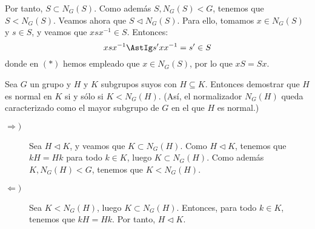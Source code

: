 \begin{ejercicio}
\begin{enumerate}
        Por tanto, $S\subset N_G(S)$. Como además $S,N_G(S)< G$, tenemos que $S< N_G(S)$. Veamos ahora que $S\lhd N_G(S)$. Para ello, tomamos $x\in N_G(S)$ y $s\in S$, y veamos que $xsx^{-1}\in S$. Entonces:
        \begin{equation*}
            xsx^{-1} \AstIg s'xx^{-1}=s'\in S
        \end{equation*}
        donde en $(\ast)$ hemos empleado que $x\in N_G(S)$, por lo que $xS=Sx$.
    \end{enumerate}
\end{ejercicio}

\begin{ejercicio}
    Sea $G$ un grupo y $H$ y $K$ subgrupos suyos con $H\subseteq K$. Entonces demostrar que $H$ es normal en $K$ si y sólo si $K< N_G(H)$. (Así, el normalizador $N_G(H)$ queda caracterizado como el mayor subgrupo de $G$ en el que $H$ es normal.)
    \begin{description}
        \item[$\Longrightarrow)$]
        Sea $H\lhd K$, y veamos que $K\subset N_G(H)$. Como $H\lhd K$, tenemos que $kH=Hk$ para todo $k\in K$, luego $K\subset N_G(H)$. Como además $K,N_G(H)<G$, tenemos que $K<N_G(H)$.

        \item[$\Longleftarrow)$]
        Sea $K<N_G(H)$, luego $K\subset N_G(H)$. Entonces, para todo $k\in K$, tenemos que $kH=Hk$. Por tanto, $H\lhd K$.        
    \end{description}
\end{ejercicio}

